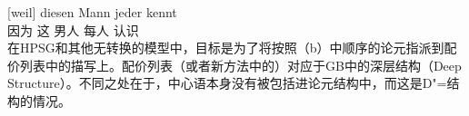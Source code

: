 \ex 
\gll {}[weil] diesen Mann jeder kennt\\
	 {}\spacebr{}因为 这 男人 每人 认识\\
\zl
在HPSG和其他无转换的模型中，目标是为了将按照（b）中顺序的论元指派到配价列表中的描写上。配价列表（或者新方法中的\argst ）对应于GB中的深层结构（Deep Structure）。不同之处在于，中心语本身没有被包括进论元结构中，而这是D"=结构的情况。

